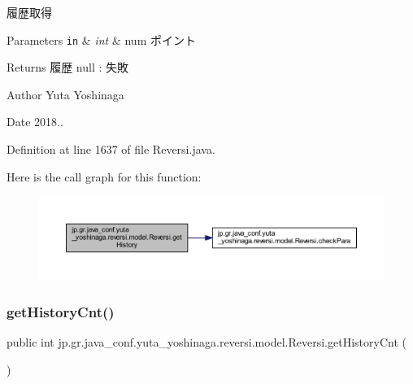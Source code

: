 履歴取得 


\begin{DoxyParams}[1]{Parameters}
\mbox{\tt in}  & {\em int} & num ポイント \\
\hline
\end{DoxyParams}
\begin{DoxyReturn}{Returns}
履歴 null \+: 失敗 
\end{DoxyReturn}
\begin{DoxyAuthor}{Author}
Yuta Yoshinaga 
\end{DoxyAuthor}
\begin{DoxyDate}{Date}
2018.. 
\end{DoxyDate}


Definition at line 1637 of file Reversi.\+java.

Here is the call graph for this function\+:
\nopagebreak
\begin{figure}[H]
\begin{center}
\leavevmode
\includegraphics[width=350pt]{classjp_1_1gr_1_1java__conf_1_1yuta__yoshinaga_1_1reversi_1_1model_1_1_reversi_af781f5ebb4fb33b574ec58acfb45a796_cgraph}
\end{center}
\end{figure}
\mbox{\label{classjp_1_1gr_1_1java__conf_1_1yuta__yoshinaga_1_1reversi_1_1model_1_1_reversi_a286949e070d0cfc8a1d9562a298b7b98}} 
\subsubsection{\texorpdfstring{get\+History\+Cnt()}{getHistoryCnt()}}
{\footnotesize\ttfamily public int jp.\+gr.\+java\+\_\+conf.\+yuta\+\_\+yoshinaga.\+reversi.\+model.\+Reversi.\+get\+History\+Cnt (\begin{DoxyParamCaption}{ }\end{DoxyParamCaption})}



